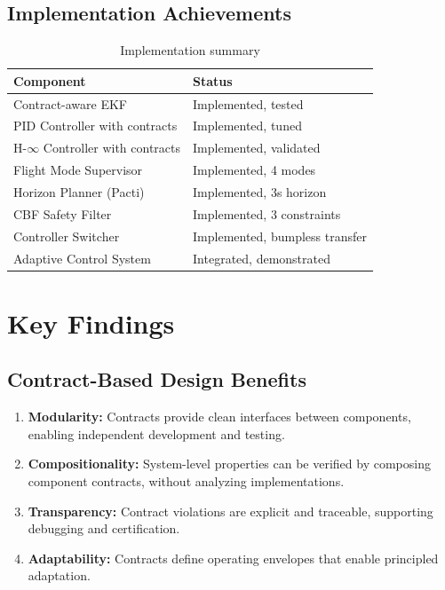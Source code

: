 \subsection{Implementation Achievements}

\begin{table}[htbp]
    \centering
    \caption{Implementation summary}
    \label{tab:implementation_summary}
    \begin{tabular}{@{}ll@{}}
        \toprule
        \textbf{Component} & \textbf{Status} \\
        \midrule
        Contract-aware EKF & Implemented, tested \\
        PID Controller with contracts & Implemented, tuned \\
        H-$\infty$ Controller with contracts & Implemented, validated \\
        Flight Mode Supervisor & Implemented, 4 modes \\
        Horizon Planner (Pacti) & Implemented, 3s horizon \\
        CBF Safety Filter & Implemented, 3 constraints \\
        Controller Switcher & Implemented, bumpless transfer \\
        Adaptive Control System & Integrated, demonstrated \\
        \bottomrule
    \end{tabular}
\end{table}

\section{Key Findings}

\subsection{Contract-Based Design Benefits}

\begin{enumerate}
    \item \textbf{Modularity:} Contracts provide clean interfaces between components, enabling independent development and testing.

    \item \textbf{Compositionality:} System-level properties can be verified by composing component contracts, without analyzing implementations.

    \item \textbf{Transparency:} Contract violations are explicit and traceable, supporting debugging and certification.

    \item \textbf{Adaptability:} Contracts define operating envelopes that enable principled adaptation.
\end{enumerate}

